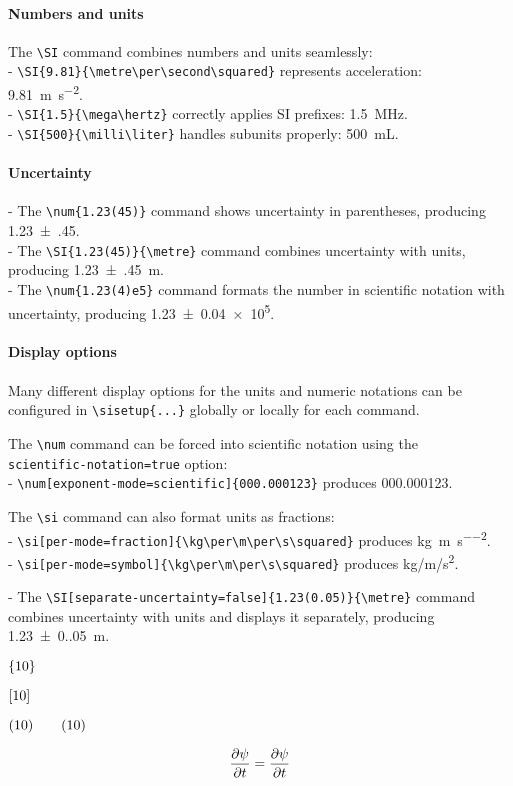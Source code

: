 	\paragraph*{Numbers and units}
	The \verb|\SI| command combines numbers and units seamlessly:  \\
	- \verb|\SI{9.81}{\metre\per\second\squared}| represents acceleration:\\ \SI{9.81}{\metre\per\second\squared}.  \\
	- \verb|\SI{1.5}{\mega\hertz}| correctly applies SI prefixes: \SI{1.5}{\mega\hertz}.  \\
	- \verb|\SI{500}{\milli\liter}| handles subunits properly: \SI{500}{\milli\liter}.
	
	\paragraph*{Uncertainty}
	- The \verb|\num{1.23(45)}| command shows uncertainty in parentheses, producing \num{1.23(45)}. \\
	- The \verb|\SI{1.23(45)}{\metre}| command combines uncertainty with units, producing \SI{1.23(45)}{\metre}.  \\
	- The \verb|\num{1.23(4)e5}| command formats the number in scientific notation with uncertainty, producing \num{1.23(4)e5}.  
	
	\paragraph*{Display options}
	Many different display options for the units and numeric notations can be configured in \verb|\sisetup{...}| globally or locally for each command.
	
	The \verb|\num| command can be forced into scientific notation using the \\ 
	\verb|scientific-notation=true| option:\\  
	- \verb|\num[exponent-mode=scientific]{000.000123}| produces \num[exponent-mode=scientific]{000.000123}.  
	
	The \verb|\si| command can also format units as fractions:  \\
	- \verb|\si[per-mode=fraction]{\kg\per\m\per\s\squared}| produces \si[per-mode=fraction]{\kg\per\m\per\s\squared}.\\
	- \verb|\si[per-mode=symbol]{\kg\per\m\per\s\squared}| produces \si[per-mode=symbol]{\kg\per\m\per\s\squared}.  
	
	- The \verb|\SI[separate-uncertainty=false]{1.23(0.05)}{\metre}| command combines uncertainty with units and displays it separately, producing \SI[separate-uncertainty=false]{1.23(0.05)}{\metre}.  
	
	
	
	
	
	
	
$\set{10}$

$\set[10]$

$\set(10) \qquad \qty(10)$


\begin{equation}
	\pdv{\psi}{t} 
	= 
	\frac{\partial \psi}{\partial t}
\end{equation}

